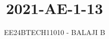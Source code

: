 \documentclass[journal]{IEEEtran}
\begin{document}

\vspace{3cm}

\title{2021-AE-1-13}
\author{EE24BTECH11010 - BALAJI B}
{\let\newpage\relax\maketitle}

\renewcommand{\thefigure}{\theenumi}
\renewcommand{\thetable}{\theenumi}
\setlength{\intextsep}{10pt} %


\renewcommand{\thetable}{\theenumi}
\end{document}
